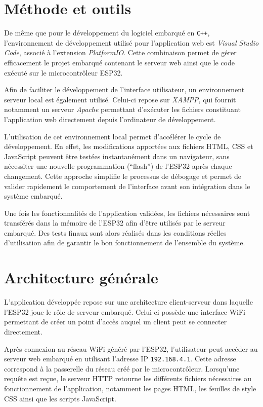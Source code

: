 


\section{Méthode et outils}


De même que pour le développement du logiciel embarqué en \texttt{C++}, l'environnement de développement utilisé pour l'application web est \textit{Visual Studio Code}, associé à l'extension \textit{PlatformIO}. Cette combinaison permet de gérer efficacement le projet embarqué contenant le serveur web ainsi que le code exécuté sur le microcontrôleur ESP32.

Afin de faciliter le développement de l'interface utilisateur, un environnement serveur local est également utilisé. Celui-ci repose sur \textit{XAMPP}, qui fournit notamment un serveur \textit{Apache} permettant d'exécuter les fichiers constituant l'application web directement depuis l'ordinateur de développement.

L'utilisation de cet environnement local permet d'accélérer le cycle de développement. En effet, les modifications apportées aux fichiers HTML, CSS et JavaScript peuvent être testées instantanément dans un navigateur, sans nécessiter une nouvelle programmation (``flash'') de l'ESP32 après chaque changement. Cette approche simplifie le processus de débogage et permet de valider rapidement le comportement de l'interface avant son intégration dans le système embarqué.

Une fois les fonctionnalités de l'application validées, les fichiers nécessaires sont transférés dans la mémoire de l'ESP32 afin d'être utilisés par le serveur embarqué. Des tests finaux sont alors réalisés dans les conditions réelles d'utilisation afin de garantir le bon fonctionnement de l'ensemble du système.

\section{Architecture générale}

L'application développée repose sur une architecture client-serveur dans laquelle l'ESP32 joue le rôle de serveur embarqué. Celui-ci possède une interface WiFi permettant de créer un point d'accès auquel un client peut se connecter directement.

Après connexion au réseau WiFi généré par l'ESP32, l'utilisateur peut accéder au serveur web embarqué en utilisant l'adresse IP \texttt{192.168.4.1}. Cette adresse correspond à la passerelle du réseau créé par le microcontrôleur. Lorsqu'une requête est reçue, le serveur HTTP retourne les différents fichiers nécessaires au fonctionnement de l'application, notamment les pages HTML, les feuilles de style CSS ainsi que les scripts JavaScript.

